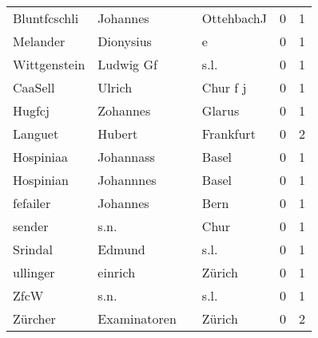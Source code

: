 \begin{center}
\begin{tiny}
\begin{longtabu}{llllrr}
             Bluntfcschli &                           Johannes &             &                                  OttehbachJ &          0 &         1 \\
                 Melander &                          Dionysius &             &                                           e &          0 &         1 \\
             Wittgenstein &                          Ludwig Gf &             &                                        s.l. &          0 &         1 \\
                  CaaSell &                             Ulrich &             &                                    Chur f j &          0 &         1 \\
                   Hugfcj &                           Zohannes &             &                                      Glarus &          0 &         1 \\
                  Languet &                             Hubert &             &                                   Frankfurt &          0 &         2 \\
                Hospiniaa &                          Johannass &             &                                       Basel &          0 &         1 \\
                Hospinian &                          Johannnes &             &                                       Basel &          0 &         1 \\
                 fefailer &                           Johannes &             &                                        Bern &          0 &         1 \\
                   sender &                               s.n. &             &                                        Chur &          0 &         1 \\
                  Srindal &                             Edmund &             &                                        s.l. &          0 &         1 \\
                 ullinger &                            einrich &             &                                      Zürich &          0 &         1 \\
                     ZfcW &                               s.n. &             &                                        s.l. &          0 &         1 \\
                  Zürcher &                       Examinatoren &             &                                      Zürich &          0 &         2 \\

\end{longtabu}
\end{tiny}
\end{center}
